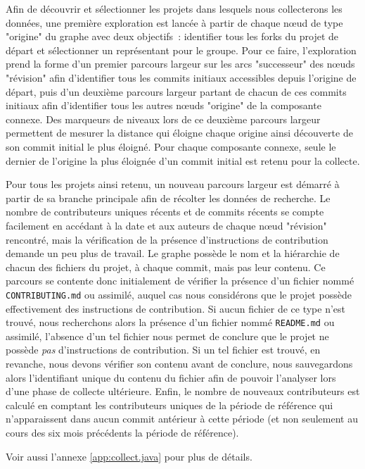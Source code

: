 Afin de découvrir et sélectionner les projets dans lesquels nous collecterons les données, une première
exploration est lancée à partir de chaque nœud de type "origine" du graphe avec deux objectifs : identifier
tous les \glspl{fork} du projet de départ et sélectionner un représentant pour le groupe. Pour ce faire,
l'exploration prend la forme d'un premier parcours largeur sur les arcs "successeur" des nœuds "révision" afin
d'identifier tous les \glspl{commit} initiaux accessibles depuis l'origine de départ, puis d'un deuxième
parcours largeur partant de chacun de ces \glspl{commit} initiaux afin d'identifier tous les autres nœuds
"origine" de la composante connexe. Des marqueurs de niveaux lors de ce deuxième parcours largeur permettent
de mesurer la distance qui éloigne chaque origine ainsi découverte de son \gls{commit} initial le plus
éloigné. Pour chaque composante connexe, seule le dernier  de l'origine la plus éloignée d'un
\gls{commit} initial est retenu pour la collecte.

Pour tous les projets ainsi retenu, un nouveau parcours largeur est démarré à partir de sa branche principale
afin de récolter les données de recherche. Le nombre de contributeurs uniques récents et de \glspl{commit}
récents se compte facilement en accédant à la date et aux auteurs de chaque nœud "révision" rencontré, mais la
vérification de la présence d'instructions de contribution demande un peu plus de travail. Le graphe possède
le nom et la hiérarchie de chacun des fichiers du projet, à chaque \gls{commit}, mais pas leur contenu. Ce
parcours se contente donc initialement de vérifier la présence d'un fichier nommé \texttt{CONTRIBUTING.md} ou
assimilé, auquel cas nous considérons que le projet possède effectivement des instructions de contribution. Si
aucun fichier de ce type n'est trouvé, nous recherchons alors la présence d'un fichier nommé
\texttt{README.md} ou assimilé, l'absence d'un tel fichier nous permet de conclure que le projet ne possède
\emph{pas} d'instructions de contribution. Si un tel fichier est trouvé, en revanche, nous devons vérifier son
contenu avant de conclure, nous sauvegardons alors l'identifiant unique du contenu du fichier afin de pouvoir
l'analyser lors d'une phase de collecte ultérieure. Enfin, le nombre de nouveaux contributeurs est calculé en
comptant les contributeurs uniques de la période de référence qui n'apparaissent dans aucun \gls{commit}
antérieur à cette période (et non seulement au cours des six mois précédents la période de référence).

Voir aussi l'annexe \ref{app:collect.java} pour plus de détails.

